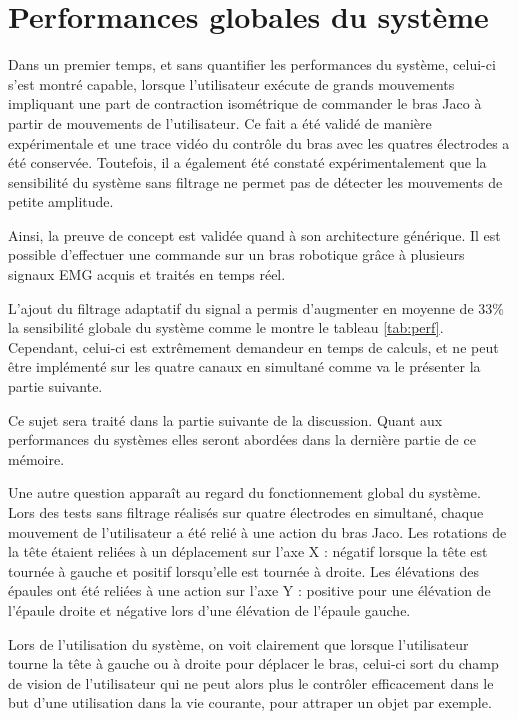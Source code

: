 \documentclass[letterpaper, twoside, 12pt, memoire, creativecommons, hyperref]{thETS}
\begin{document}
\section{Performances globales du système}

Dans un premier temps, et sans quantifier les performances du système, celui-ci s'est montré capable, lorsque l'utilisateur exécute de grands mouvements impliquant une part de contraction isométrique de commander le bras Jaco à partir de mouvements de l'utilisateur. Ce fait a été validé de manière expérimentale et une trace vidéo du contrôle du bras avec les quatres électrodes a été conservée. Toutefois, il a également été constaté expérimentalement que la sensibilité du système sans filtrage ne permet pas de détecter les mouvements de petite amplitude. 

Ainsi, la preuve de concept est validée quand à son architecture générique. Il est possible d'effectuer une commande sur un bras robotique grâce à plusieurs signaux EMG acquis et traités en temps réel.

L'ajout du filtrage adaptatif du signal a permis d'augmenter en moyenne de 33\% la sensibilité globale du système comme le montre le tableau \ref{tab:perf}. Cependant, celui-ci est extrêmement demandeur en temps de calculs, et ne peut être implémenté sur les quatre canaux en simultané comme va le présenter la partie suivante.

Ce sujet sera traité dans la partie suivante de la discussion. Quant aux performances du systèmes elles seront abordées dans la dernière partie de ce mémoire.

Une autre question apparaît au regard du fonctionnement global du système. Lors des tests sans filtrage réalisés sur quatre électrodes en simultané, chaque mouvement de l'utilisateur a été relié à une action du bras Jaco. Les rotations de la tête étaient reliées à un déplacement sur l'axe X : négatif lorsque la tête est tournée à gauche et positif lorsqu'elle est tournée à droite. Les élévations des épaules ont été reliées à une action sur l'axe Y : positive pour une élévation de l'épaule droite et négative lors d'une élévation de l'épaule gauche. 

Lors de l'utilisation du système, on voit clairement que lorsque l'utilisateur tourne la tête à gauche ou à droite pour déplacer le bras, celui-ci sort du champ de vision de l'utilisateur qui ne peut alors plus le contrôler efficacement dans le but d'une utilisation dans la vie courante, pour attraper un objet par exemple. 
\end{document}
